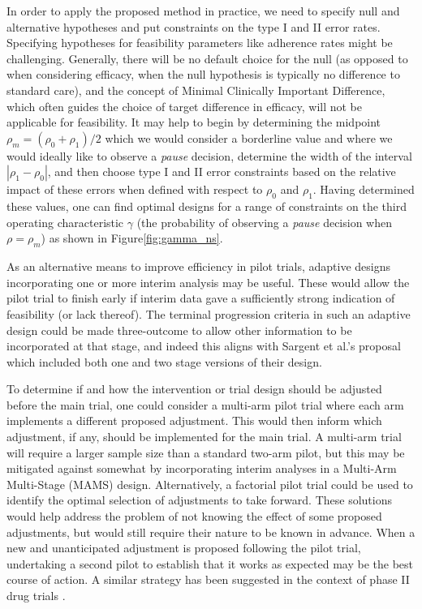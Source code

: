 \documentclass{bmcart}
\begin{document}
In order to apply the proposed method in practice, we need to specify null and alternative hypotheses and put constraints on the type I and II error rates. Specifying hypotheses for feasibility parameters like adherence rates might be challenging. Generally, there will be no default choice for the null (as opposed to when considering efficacy, when the null hypothesis is typically no difference to standard care), and the concept of Minimal Clinically Important Difference, which often guides the choice of target difference in efficacy, will not be applicable for feasibility. It may help to begin by determining the midpoint $\rho_m = (\rho_0 + \rho_1)/2$ which we would consider a borderline value and where we would ideally like to observe a \emph{pause} decision, determine the width of the interval $|\rho_1 - \rho_0|$, and then choose type I and II error constraints based on the relative impact of these errors when defined with respect to $\rho_0$ and $\rho_1$. Having determined these values, one can find optimal designs for a range of constraints on the third operating characteristic $\gamma$ (the probability of observing a   \emph{pause} decision when $\rho = \rho_m$) as shown in Figure\ref{fig:gamma_ns}.

As an alternative means to improve efficiency in pilot trials, adaptive designs incorporating one or more interim analysis may be useful. These would allow the pilot trial to finish early if interim data gave a sufficiently strong indication of feasibility (or lack thereof). The terminal progression criteria in such an adaptive design could be made three-outcome to allow other information to be incorporated at that stage, and indeed this aligns with Sargent et al.'s \cite{Sargent2001} proposal which included both one and two stage versions of their design. 

To determine if and how the intervention or trial design should be adjusted before the main trial, one could consider a multi-arm pilot trial where each arm implements a different proposed adjustment. This would then inform which adjustment, if any, should be implemented for the main trial. A multi-arm trial will require a larger sample size than a standard two-arm pilot, but this may be mitigated against somewhat by incorporating interim analyses in a Multi-Arm Multi-Stage (MAMS) design. Alternatively, a factorial pilot trial could be used to identify the optimal selection of adjustments to take forward. These solutions would help address the problem of not knowing the effect of some proposed adjustments, but would still require their nature to be known in advance. When a new and unanticipated adjustment is proposed following the pilot trial, undertaking a second pilot to establish that it works as expected may be the best course of action. A similar strategy has been suggested in the context of phase II drug trials \cite{Brown2012}.
\end{document}
